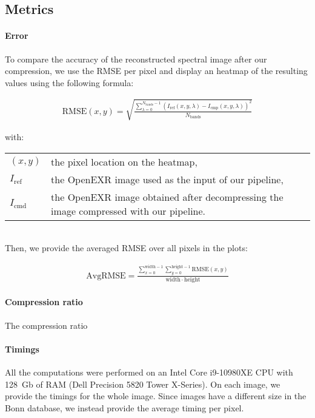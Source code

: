 \subsection{Metrics}

\paragraph{Error}
To compare the accuracy of the reconstructed spectral image after our compression, we use the RMSE per pixel and display an heatmap of the resulting values using the following formula:

\begin{align}
    \mathrm{RMSE}(x, y) = \sqrt{\frac{\sum_{\lambda = 0}^{N_\mathrm{bands} - 1} \left(I_\mathrm{ref}(x, y, \lambda) - I_\mathrm{cmp}(x, y, \lambda) \right)^2}{N_\mathrm{bands}}}
\end{align}

with:

\begin{tabularx}{\linewidth}{lX}
    $(x, y)$ & the pixel location on the heatmap, \\
    $I_\mathrm{ref}$ & the OpenEXR image used as the input of our pipeline, \\
    $I_\mathrm{cmd}$ & the OpenEXR image obtained after decompressing the image compressed with our pipeline. \\
\end{tabularx}\\

Then, we provide the averaged RMSE over all pixels in the plots:

\begin{align}
    \mathrm{AvgRMSE} = \frac{\sum_{x = 0}^{\mathrm{width} - 1} \sum_{y = 0}^{\mathrm{height} - 1} \mathrm{RMSE}(x, y)}{\mathrm{width} \cdot \mathrm{height}}
\end{align}


\paragraph{Compression ratio}

The compression ratio

\paragraph{Timings}

All the computations were performed on an Intel Core i9-10980XE CPU with 128~Gb of RAM (Dell Precision 5820 Tower X-Series). On each image, we provide the timings for the whole image. Since images have a different size in the Bonn database, we instead provide the average timing per pixel.
